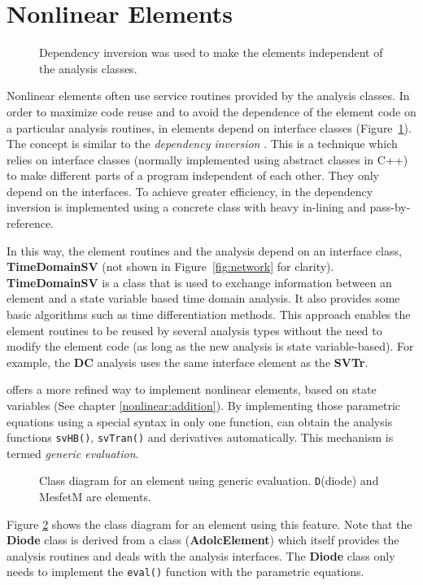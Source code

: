\section{Nonlinear Elements} \label{sec:nlelem}
%
\begin{figure}[htpb]
\centerline{\epsfxsize=8cm }
\caption{Dependency inversion was used to make the elements
independent of the analysis classes.} \label{fig:depinversion}
\end{figure}
%
Nonlinear elements often use service routines provided by the analysis
classes. In order to maximize code reuse and to avoid the dependence
of the element code on a particular analysis routines, in \FDA
elements depend on interface classes
(Figure~\ref{fig:depinversion}). The concept is similar to the
\emph{dependency inversion} \cite{dep_inv}. This is a technique which
relies on interface classes (normally implemented using abstract
classes in C++) to make different parts of a program independent of
each other. They only depend on the interfaces. To achieve greater
efficiency, in \FDA the dependency inversion is implemented using
a concrete class with heavy in-lining and pass-by-reference.

In this way, the element routines and the analysis depend on an
interface class, {\bf TimeDomainSV} (not shown in
Figure~\ref{fig:network} for clarity).  {\bf TimeDomainSV} is a class
that is used to exchange information between an element and a state
variable based time domain analysis. It also provides some basic
algorithms such as time differentiation methods. This approach enables
the element routines to be reused by several analysis types without
the need to modify the element code (as long as the new analysis is
state variable-based). For example, the {\bf DC} analysis uses the
same interface element as the {\bf SVTr}.

\FDA offers a more refined way to implement nonlinear elements,
based on state variables (See chapter \ref{nonlinear:addition}).
By implementing those parametric equations
using a special syntax in only one function, \FDA can obtain the
analysis functions {\tt svHB()}, {\tt svTran()} and derivatives
automatically. This mechanism is termed \emph{generic evaluation}.

%
\begin{figure}[htpb]
\centerline{\epsfxsize=16cm }
\caption{Class diagram for an element using generic evaluation.
{\tt D}(diode) and MesfetM are elements.}
\label{fig:adolcelement}
\end{figure}
%
Figure \ref{fig:adolcelement} shows the class diagram for an element
using this feature. Note that the {\bf Diode} class is derived from a
class ({\bf AdolcElement}) which itself provides the analysis routines
and deals with the analysis interfaces. The {\bf Diode} class only
needs to implement the {\tt eval()} function with the parametric
equations.

